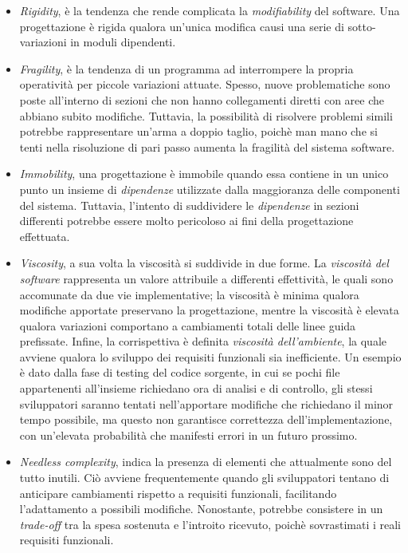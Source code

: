 \documentclass{article}
\begin{document}
\begin{itemize}[label={-}]
    \itemsep0em
    \item \textit{Rigidity}, è la tendenza che rende complicata la \textit{modifiability} del software. Una progettazione è rigida qualora un'unica modifica causi una serie di sotto-variazioni in moduli dipendenti.
    \item \textit{Fragility}, è la tendenza di un programma ad interrompere la propria operatività per piccole variazioni attuate. Spesso, nuove problematiche sono poste all'interno di sezioni che non hanno collegamenti diretti con aree che abbiano subito modifiche. Tuttavia, la possibilità di risolvere problemi simili potrebbe rappresentare un'arma a doppio taglio, poichè man mano che si tenti nella risoluzione di pari passo aumenta la fragilità del sistema software.
    \item \textit{Immobility}, una progettazione è immobile quando essa contiene in un unico punto un insieme di \textit{dipendenze} utilizzate dalla maggioranza delle componenti del sistema. Tuttavia, l'intento di suddividere le \textit{dipendenze} in sezioni differenti potrebbe essere molto pericoloso ai fini della progettazione effettuata.
    \item \textit{Viscosity}, a sua volta la viscosità si suddivide in due forme. La \textit{viscosità del software} rappresenta un valore attribuile a differenti effettività, le quali sono accomunate da due vie implementative; la viscosità è minima qualora modifiche apportate preservano la progettazione, mentre la viscosità è elevata qualora variazioni comportano a cambiamenti totali delle linee guida prefissate. Infine, la corrispettiva è definita \textit{viscosità dell'ambiente}, la quale avviene qualora lo sviluppo dei requisiti funzionali sia inefficiente. Un esempio è dato dalla fase di testing del codice sorgente, in cui se pochi file appartenenti all'insieme richiedano ora di analisi e di controllo, gli stessi sviluppatori saranno tentati nell'apportare modifiche che richiedano il minor tempo possibile, ma questo non garantisce correttezza dell'implementazione, con un'elevata probabilità che manifesti errori in un futuro prossimo.
    \item \textit{Needless complexity}, indica la presenza di elementi che attualmente sono del tutto inutili. Ciò avviene frequentemente quando gli sviluppatori tentano di anticipare cambiamenti rispetto a requisiti funzionali, facilitando l'adattamento a possibili modifiche. Nonostante, potrebbe consistere in un \textit{trade-off} tra la spesa sostenuta e l'introito ricevuto, poichè sovrastimati i reali requisiti funzionali.

\end{itemize}
\end{document}
